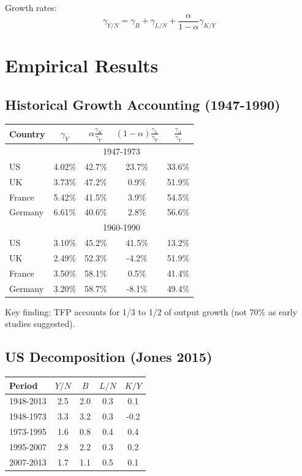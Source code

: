 \documentclass[a4paper,11pt]{article}
\newcommand{\gammay}{\gamma_Y}
\newcommand{\gammaA}{\gamma_A}
\newcommand\gammaK{\gamma_K}
\newcommand\gammaL{\gamma_L}
\begin{document}
Growth rates:
\[
\gamma_{Y/N} = \gamma_B + \gamma_{L/N} + \frac{\alpha}{1-\alpha}\gamma_{K/Y}
\tag{CD-PerCapita}
\]

\section{Empirical Results}

\subsection*{Historical Growth Accounting (1947-1990)}

\begin{center}
\begin{tabular}{lcccc}
\toprule
Country & $\gammay$ & $\alpha\frac{\gammaK}{\gammay}$ & $(1-\alpha)\frac{\gammaL}{\gammay}$ & $\frac{\gammaA}{\gammay}$ \\
\midrule
 & \multicolumn{4}{c}{1947-1973} \\
\midrule
US & 4.02\% & 42.7\% & 23.7\% & 33.6\% \\
UK & 3.73\% & 47.2\% & 0.9\% & 51.9\% \\
France & 5.42\% & 41.5\% & 3.9\% & 54.5\% \\
Germany & 6.61\% & 40.6\% & 2.8\% & 56.6\% \\
\midrule
 & \multicolumn{4}{c}{1960-1990} \\
\midrule
US & 3.10\% & 45.2\% & 41.5\% & 13.2\% \\
UK & 2.49\% & 52.3\% & -4.2\% & 51.9\% \\
France & 3.50\% & 58.1\% & 0.5\% & 41.4\% \\
Germany & 3.20\% & 58.7\% & -8.1\% & 49.4\% \\
\bottomrule
\end{tabular}
\end{center}

Key finding: TFP accounts for 1/3 to 1/2 of output growth (not 70\% as early studies suggested).

\subsection*{US Decomposition (Jones 2015)}

\begin{center}
\begin{tabular}{lcccc}
\toprule
Period & $Y/N$ & $B$ & $L/N$ & $K/Y$ \\
\midrule
1948-2013 & 2.5 & 2.0 & 0.3 & 0.1 \\
1948-1973 & 3.3 & 3.2 & 0.3 & -0.2 \\
1973-1995 & 1.6 & 0.8 & 0.4 & 0.4 \\
1995-2007 & 2.8 & 2.2 & 0.3 & 0.2 \\
2007-2013 & 1.7 & 1.1 & 0.5 & 0.1 \\
\bottomrule
\end{tabular}
\end{center}
\end{document}

